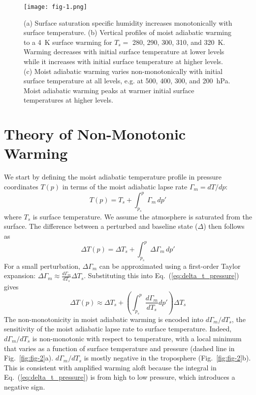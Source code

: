 \documentclass[]{ametsocV6.1}
\begin{document}
\begin{figure}[htbp]
 \centering
 \texttt{[image: fig-1.png]}\\
\caption{(a) Surface saturation specific humidity increases monotonically with surface temperature. (b) Vertical profiles of moist adiabatic warming to a 4~K surface warming for $T_s = $ 280, 290, 300, 310, and 320~K. Warming decreases with initial surface temperature at lower levels while it increases with initial surface temperature at higher levels. (c) Moist adiabatic warming varies non-monotonically with initial surface temperature at all levels, e.g. at 500, 400, 300, and 200~hPa. Moist adiabatic warming peaks at warmer initial surface temperatures at higher levels.}
\label{fig:fig-1}
\end{figure}

\section{Theory of Non-Monotonic Warming}
We start by defining the moist adiabatic temperature profile in pressure coordinates $T(p)$ in terms of the moist adiabatic lapse rate $\Gamma_m = dT/dp$:
\begin{equation}
T(p) = T_s + \int_{p_s}^{p} \Gamma_m \, dp' \label{eq:temp_profile_pressure}
\end{equation}
where $T_s$ is surface temperature. We assume the atmosphere is saturated from the surface. The difference between a perturbed and baseline state ($\Delta$) then follows as
\begin{equation}
\Delta T(p) = \Delta T_s + \int_{p_s}^{p} \Delta\Gamma_m \, dp' \label{eq:delta_t_pressure}
\end{equation}
For a small perturbation, $\Delta \Gamma_m$ can be approximated using a first-order Taylor expansion: $\Delta\Gamma_m \approx \frac{d\Gamma_m}{dT_s}\Delta T_s$. Substituting this into Eq.~(\ref{eq:delta_t_pressure}) gives
\begin{equation}
\Delta T(p) \approx \Delta T_s + \left(\int_{p_s}^{p} \frac{d\Gamma_m}{dT_s}dp'\right)\Delta T_s \label{eq:delta_t_taylor_pressure}
\end{equation}
The non-monotonicity in moist adiabatic warming is encoded into $d\Gamma_m/dT_s$, the sensitivity of the moist adiabatic lapse rate to surface temperature. Indeed, $d\Gamma_m/dT_s$ is non-monotonic with respect to temperature, with a local minimum that varies as a function of surface temperature and pressure (dashed line in Fig.~\ref{fig:fig-2}a). $d\Gamma_m/dT_s$ is mostly negative in the troposphere (Fig.~\ref{fig:fig-2}b). This is consistent with amplified warming aloft because the integral in Eq.~(\ref{eq:delta_t_pressure}) is from high to low pressure, which introduces a negative sign.
\end{document}
